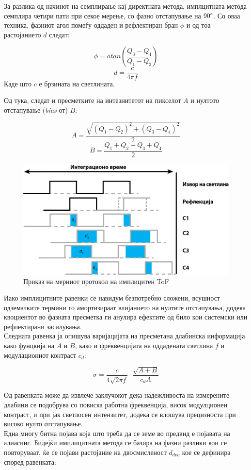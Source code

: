 \documentclass[12pt]{article}
\begin{document}
		За разлика од начинот на семплирање кај директната метода, имплцитната метода семплира четири пати при секое мерење, со фазно отстапување на $90\degree$. Со оваа техника, фазниот агол помеѓу оддаден и рефлектиран бран $\phi$ и од тоа растојанието $d$ следат:

		$$ \phi = atan(\frac{Q_3 - Q_4}{Q_1 - Q_2}) $$
		$$ d = \frac{c}{4\pi f} $$
		Каде што $c$ е брзината на светлината.


		Од тука, следат и пресметките на интезнитетот на пикселот $A$ и нултото отстапување (\textit{bias}-от) $B$:

		$$ A = \frac{\sqrt{(Q_1 - Q_2)^2  + (Q_3 - Q_4)^2}}{2} $$
		$$ B = \frac{Q_1 + Q_2 + Q_3 + Q_4}{2} $$


		\begin{figure}[H]
			\includegraphics[width=0.75\linewidth]{./images/CWToF.png}
			\centering
			\caption{Приказ на мерниот протокол на имплицитен ToF}
			\label{fig:CWToF.png}
			\end{figure}

		Иако имплицитните равенки се навидум безпотребно сложени, всушност одземачките термини го амортизираат влијанието на нултите отстапувања, додека квоциентот во фазната пресметка ги анулира ефектите од било кои системски или рефлектирани засилувања.\\
		Следната равенка ја опишува варијацијата на пресметана длабинска информација како фунцкија на $A$ и $B$, како и фреквенцијата на оддадената светлина $f$ и модулациониот контраст $c_d$:

		$$ \sigma = \frac{c}{4\sqrt{2\pi f}} \cdot \frac{\sqrt{A+B}}{c_d A} $$

		Од равенката може да извлече заклучокот дека надежливоста на измерените длабини се подобрува со повиска работна фреквенција, висок модулционен контраст, и при јак светлосен интензитет, додека се влошува прецизноста при високо нулто отстапување.
		\\
		Една многу битна појава која што треба да се земе во предвид е појавата на алиасинг. Бидејќи имплицитната метода се базира на фазни разлики кои се повторуваат, ќе се појави растојание на двосмисленост $d_{dvo}$ кое се дефинира според равенката:
\end{document}
